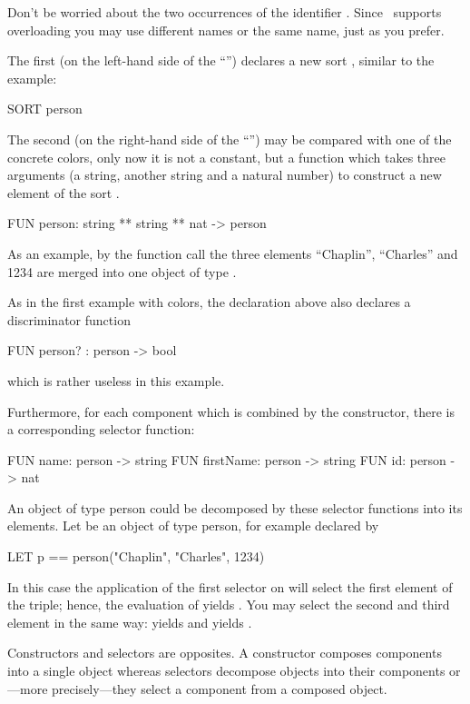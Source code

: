 Don't be worried about the two occurrences of the identifier
.
Since \opal\ supports overloading you may use different names or the same
name, just as you prefer.

The first  (on the left-hand side of the ``\pro{==}'') declares
a new sort , similar to the  example:
\begin{prog}
        SORT person  
\end{prog}

The second  (on the right-hand side of the ``\pro{==}'') may be
compared with one of the concrete colors, only now it is not a constant,
but a function which takes three arguments (a string, another string
and a natural number) to construct a new element of the sort .
\begin{prog}
        FUN person: string ** string ** nat -> person
\end{prog}

As an example, by the function call  the three elements ``Chaplin'', ``Charles'' and
1234 are merged into one object of type .

\smallskip
As in the first example with colors, the declaration above also declares
a discriminator function
\begin{prog}
        FUN person? : person -> bool
\end{prog}
which is rather useless in this example.
\medskip

Furthermore, for each component which is combined by the constructor,
there is a corresponding selector function:
\begin{prog}
        FUN name: person -> string
        FUN firstName: person -> string
        FUN id: person -> nat
\end{prog}
An object of type person could be decomposed by these selector
functions  into its elements. 
Let  be an object of type person, for example declared by 
\begin{prog}
        LET p == person("Chaplin", "Charles", 1234)
\end{prog}
In this case the application of the first selector  on
 will select the first element of the triple; hence, the
evaluation of  yields .
 You may select the second and third element in the same way:
 yields  and  yields
.

Constructors and selectors are opposites.
A constructor composes components into a single object whereas
selectors decompose objects into their components or---more
precisely---they select a component from a composed object.


